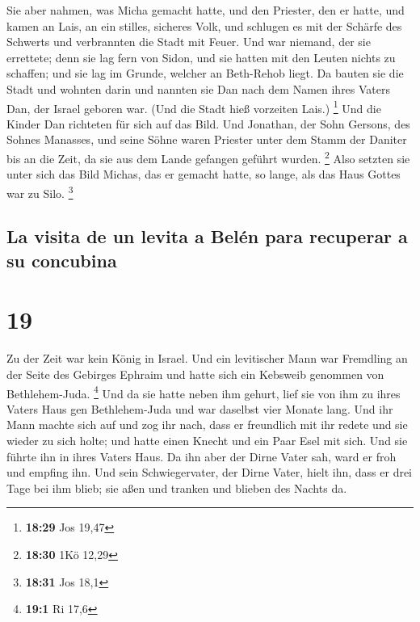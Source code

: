  Sie aber nahmen, was Micha gemacht hatte, und den
Priester, den er hatte, und kamen an Lais, an ein stilles, sicheres
Volk, und schlugen es mit der Schärfe des Schwerts und verbrannten die
Stadt mit Feuer.  Und war niemand, der sie errettete;
denn sie lag fern von Sidon, und sie hatten mit den Leuten nichts zu
schaffen; und sie lag im Grunde, welcher an Beth-Rehob liegt. Da bauten
sie die Stadt und wohnten darin  und nannten sie Dan nach
dem Namen ihres Vaters Dan, der Israel geboren war. (Und die Stadt hieß
vorzeiten Lais.) \footnote{\textbf{18:29} Jos 19,47}  Und
die Kinder Dan richteten für sich auf das Bild. Und Jonathan, der Sohn
Gersons, des Sohnes Manasses, und seine Söhne waren Priester unter dem
Stamm der Daniter bis an die Zeit, da sie aus dem Lande gefangen geführt
wurden. \footnote{\textbf{18:30} 1Kö 12,29}  Also setzten
sie unter sich das Bild Michas, das er gemacht hatte, so lange, als das
Haus Gottes war zu Silo. \footnote{\textbf{18:31} Jos 18,1}

\hypertarget{la-visita-de-un-levita-a-beluxe9n-para-recuperar-a-su-concubina}{%
\subsection{La visita de un levita a Belén para recuperar a su
concubina}\label{la-visita-de-un-levita-a-beluxe9n-para-recuperar-a-su-concubina}}

\hypertarget{section-18}{%
\section{19}\label{section-18}}

 Zu der Zeit war kein König in Israel. Und ein levitischer
Mann war Fremdling an der Seite des Gebirges Ephraim und hatte sich ein
Kebsweib genommen von Bethlehem-Juda. \footnote{\textbf{19:1} Ri 17,6}
 Und da sie hatte neben ihm gehurt, lief sie von ihm zu
ihres Vaters Haus gen Bethlehem-Juda und war daselbst vier Monate lang.
 Und ihr Mann machte sich auf und zog ihr nach, dass er
freundlich mit ihr redete und sie wieder zu sich holte; und hatte einen
Knecht und ein Paar Esel mit sich. Und sie führte ihn in ihres Vaters
Haus. Da ihn aber der Dirne Vater sah, ward er froh und empfing ihn.
 Und sein Schwiegervater, der Dirne Vater, hielt ihn, dass
er drei Tage bei ihm blieb; sie aßen und tranken und blieben des Nachts
da.

